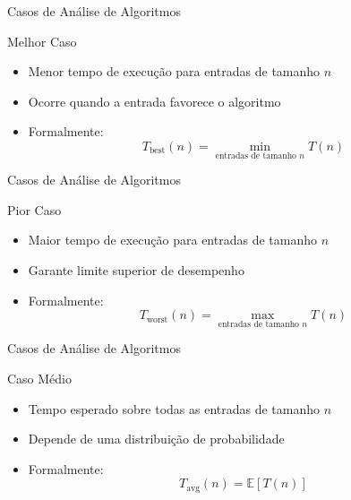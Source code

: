 \documentclass{beamer}
\begin{document}
\begin{frame}{Casos de Análise de Algoritmos}

\begin{block}{Melhor Caso}
\begin{itemize}
    \item Menor tempo de execução para entradas de tamanho $n$
    \item Ocorre quando a entrada favorece o algoritmo
    \item Formalmente:
    \[
    T_{\text{best}}(n) = \min_{\text{entradas de tamanho } n} T(n)
    \]
\end{itemize}
\end{block}

\end{frame}
\begin{frame}{Casos de Análise de Algoritmos}


\begin{block}{Pior Caso}
\begin{itemize}
    \item Maior tempo de execução para entradas de tamanho $n$
    \item Garante limite superior de desempenho
    \item Formalmente:
    \[
    T_{\text{worst}}(n) = \max_{\text{entradas de tamanho } n} T(n)
    \]
\end{itemize}
\end{block}

\vspace{0.2cm}


\end{frame}
\begin{frame}{Casos de Análise de Algoritmos}

\begin{block}{Caso Médio}
\begin{itemize}
    \item Tempo esperado sobre todas as entradas de tamanho $n$
    \item Depende de uma distribuição de probabilidade
    \item Formalmente:
    \[
    T_{\text{avg}}(n) = \mathbb{E}[T(n)]
    \]
\end{itemize}
\end{block}

\end{frame}
\end{document}
